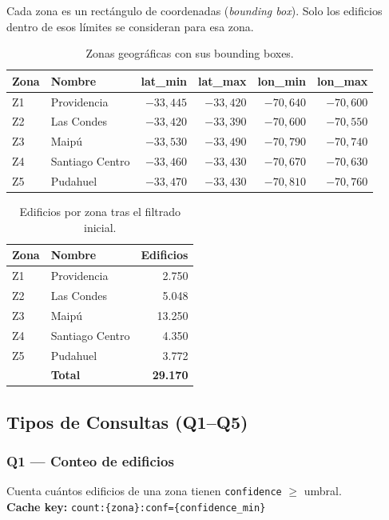 \documentclass[letter,12pt]{article}
\begin{document}
Cada zona es un rectángulo de coordenadas (\textit{bounding box}). Solo los edificios
dentro de esos límites se consideran para esa zona.

\begin{table}[H]
\centering
\begin{tabular}{llrrrr}
\toprule
\textbf{Zona} & \textbf{Nombre} & \textbf{lat\_min} & \textbf{lat\_max} & \textbf{lon\_min} & \textbf{lon\_max} \\
\midrule
Z1 & Providencia      & $-33{,}445$ & $-33{,}420$ & $-70{,}640$ & $-70{,}600$ \\
Z2 & Las Condes       & $-33{,}420$ & $-33{,}390$ & $-70{,}600$ & $-70{,}550$ \\
Z3 & Maipú            & $-33{,}530$ & $-33{,}490$ & $-70{,}790$ & $-70{,}740$ \\
Z4 & Santiago Centro  & $-33{,}460$ & $-33{,}430$ & $-70{,}670$ & $-70{,}630$ \\
Z5 & Pudahuel         & $-33{,}470$ & $-33{,}430$ & $-70{,}810$ & $-70{,}760$ \\
\bottomrule
\end{tabular}
\caption{Zonas geográficas con sus bounding boxes.}
\end{table}

\begin{table}[H]
\centering
\begin{tabular}{llr}
\toprule
\textbf{Zona} & \textbf{Nombre} & \textbf{Edificios} \\
\midrule
Z1 & Providencia      & 2.750  \\
Z2 & Las Condes       & 5.048  \\
Z3 & Maipú            & 13.250 \\
Z4 & Santiago Centro  & 4.350  \\
Z5 & Pudahuel         & 3.772  \\
\midrule
   & \textbf{Total}   & \textbf{29.170} \\
\bottomrule
\end{tabular}
\caption{Edificios por zona tras el filtrado inicial.}
\end{table}

\subsection{Tipos de Consultas (Q1--Q5)}

\subsubsection{Q1 --- Conteo de edificios}
Cuenta cuántos edificios de una zona tienen \texttt{confidence} $\geq$ umbral.\\
\textbf{Cache key:} \texttt{count:\{zona\}:conf=\{confidence\_min\}}
\end{document}
